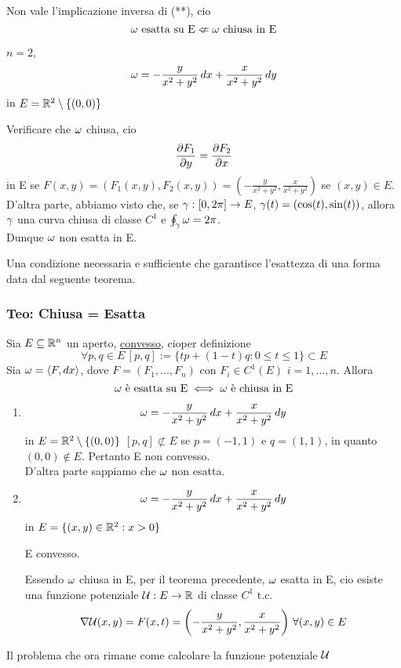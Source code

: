 \begin{osservazione}
  Non vale l'implicazione inversa di (**), cio\ace
  $$\omega \text{ esatta su E} \nLeftarrow \omega \text{ chiusa in E}$$
\end{osservazione}
\begin{example}
  $n=2$, $$\omega = -\frac{y}{x^2+y^2}\,dx + \frac{x}{x^2+y^2}\,dy$$ in $E = \mathbb{R}^2 \setminus\{(0,0)\}$
  \begin{exercise}
    Verificare che $\omega$ \ace chiusa, cio\ace 
    $$\frac{\partial F_1}{\partial y}=\frac{\partial F_2}{\partial x}$$
    in E se $F(x,y) = \left(F_1(x,y), F_2(x,y)\right) = \left(-\frac{y}{x^2+y^2},\frac{x}{x^2+y^2}\right)$
    se $(x,y) \in E$. \\
    D'altra parte, abbiamo visto che, se $\gamma:[0,2\pi] \to E$, $\gamma(t) = (\cos(t),\sin(t))$, allora 
    $\gamma$ \ace una curva chiusa di classe $C^1$ e $\oint_{\gamma} \omega = 2\pi$.\\
    Dunque $\omega$ non \ace esatta in E.
  \end{exercise}
\end{example}
Una condizione necessaria e sufficiente che garantisce l'esattezza di una forma \ace 
data dal seguente teorema.
\subsubsection{Teo: Chiusa = Esatta}
\begin{theorem}[Chiusa = Esatta][BDPG,12.21]
  \label{chiusaesatta}
  Sia $E\subseteq \mathbb{R}^n$ un aperto, \underline{convesso}, cio\ace per definizione
  $$\forall p,q \in E \, [p,q] := \{tp + (1-t)q : 0 \leq t \leq 1\} \subset E$$
  Sia $\omega = \left\langle F,dx \right\rangle$, dove $F=(F_1,...,F_n)$ con $F_i \in C^1(E)$ $i = 1,...,n$.
  Allora 
  $$\omega \text{ \`e esatta su E} \iff \omega \text{ \`e chiusa in E}$$
\end{theorem}
\begin{example}
  \begin{enumerate}
    \item $$\omega = -\frac{y}{x^2+y^2}\,dx + \frac{x}{x^2+y^2}\,dy$$ in $E = \mathbb{R}^2 \setminus\{(0,0)\}$
          $[p,q] \not \subset E$ se $p = (-1,1)$ e $q=(1,1)$, in quanto $(0,0)\not \in E$.
          Pertanto E non \ace convesso. \\
          D'altra parte sappiamo che $\omega$ non \ace esatta.
    \item $$\omega = -\frac{y}{x^2+y^2}\,dx + \frac{x}{x^2+y^2}\,dy$$ in $E = \{(x,y)\in\mathbb{R}^2:x>0\}$
          \begin{exercise}
            E \ace convesso.
          \end{exercise}
          Essendo $\omega$ chiusa in E, per il teorema precedente, $\omega$ \ace esatta in E, cio\ace 
          esiste una funzione potenziale $\mathcal{U} : E \to \mathbb{R}$ di classe $C^1$ t.c.
          $$\nabla\mathcal{U}(x,y) = F(x,t) = \left(-\frac{y}{x^2+y^2}, \frac{x}{x^2+y^2}\right) \, \forall (x,y)\in E$$
  \end{enumerate}
\end{example}
Il problema che ora rimane \ace come calcolare la funzione potenziale $\mathcal{U}$
